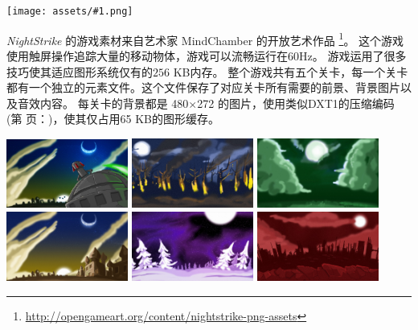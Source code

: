 \documentclass[10pt]{book}
\newcommand{\png}[1]{
\begin{center}
\texttt{[image: assets/\#1.png]}
\end{center}
}
\newcommand{\xref}[1]{第 \pageref{#1} 页：\textit{\nameref{#1}}}
\begin{document}
\begin{CJK}{UTF8}{gkai}
\png{nightstrike}

\textit{NightStrike} 的游戏素材来自艺术家 MindChamber 的开放艺术作品 \footnote{\url{http://opengameart.org/content/nightstrike-png-assets}}。
这个游戏使用触屏操作追踪大量的移动物体，游戏可以流畅运行在60Hz。
游戏运用了很多技巧使其适应图形系统仅有的${256}$ KB内存。
整个游戏共有五个关卡，每一个关卡都有一个独立的元素文件。这个文件保存了对应关卡所有需要的前景、背景图片以及音效内容。
每关卡的背景都是 480$\times$272 的图片，使用类似DXT1的压缩编码 (\xref{dxt1})，使其仅占用65 KB的图形缓存。

\begin{center}
\includegraphics[width=0.3\textwidth]{assets/nightstrike/backgrounds/welcome.jpg}
\includegraphics[width=0.3\textwidth]{assets/nightstrike/backgrounds/burningwoods.jpg}
\includegraphics[width=0.3\textwidth]{assets/nightstrike/backgrounds/greenland.jpg}
\includegraphics[width=0.3\textwidth]{assets/nightstrike/backgrounds/nightfall.jpg}
\includegraphics[width=0.3\textwidth]{assets/nightstrike/backgrounds/purplesnow.jpg}
\includegraphics[width=0.3\textwidth]{assets/nightstrike/backgrounds/redworld.jpg}
\end{center}


\end{CJK}
\end{document}
